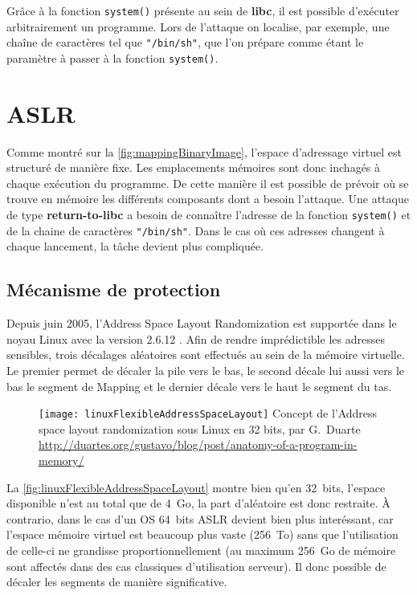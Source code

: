 Grâce à la fonction \texttt{system()} présente au sein de \textbf{libc}, il est possible d'exécuter arbitrairement un programme. Lors de l'attaque on localise, par exemple, une chaîne de caractères tel que \texttt{"/bin/sh"}, que l'on prépare comme étant le paramètre à passer à la fonction \texttt{system()}.

\section{ASLR}

Comme montré sur la \autoref{fig:mappingBinaryImage}, l'espace d'adressage virtuel est structuré de manière fixe. Les emplacements mémoires sont donc inchagés à chaque exécution du programme. De cette manière il est possible de prévoir où se trouve en mémoire les différents composants dont a besoin l'attaque. Une attaque de type \textbf{\og return-to-libc \fg} a besoin de connaître l'adresse de la fonction \texttt{system()} et de la chaine de caractères \texttt{"/bin/sh"}. Dans le cas où ces adresses changent à chaque lancement, la tâche devient plus compliquée.

\subsection{Mécanisme de protection}

Depuis juin 2005, l'Address Space Layout Randomization est supportée dans le noyau Linux avec la version 2.6.12 \cite{AddressSpaceLayoutRandomizationFR} \cite{AddressSpaceLayoutRandomizationEN}. Afin de rendre imprédictible les adresses sensibles, trois décalages aléatoires sont effectués au sein de la mémoire virtuelle. Le premier permet de décaler la pile vers le bas, le second décale lui aussi vers le bas le segment de Mapping et le dernier décale vers le haut le segment du tas.

\begin{figure}[H]
	\centering
	\texttt{[image: linuxFlexibleAddressSpaceLayout]}
	{Concept de l'Address space layout randomization sous Linux en 32 bits, par G.~Duarte}
	{\url{http://duartes.org/gustavo/blog/post/anatomy-of-a-program-in-memory/}}
	\label{fig:linuxFlexibleAddressSpaceLayout}
\end{figure}

La \autoref{fig:linuxFlexibleAddressSpaceLayout} montre bien qu'en 32~bits, l'espace disponible n'est au total que de 4~Go, la part d'aléatoire est donc restraite. À contrario, dans le cas d'un OS 64~bits ASLR devient bien plus interéssant, car l'espace mémoire virtuel est beaucoup plus vaste (256~To) sans que l'utilisation de celle-ci ne grandisse proportionnellement (au maximum 256~Go de mémoire sont affectés dans des cas classiques d'utilisation serveur). Il donc possible de décaler les segments de manière significative.

